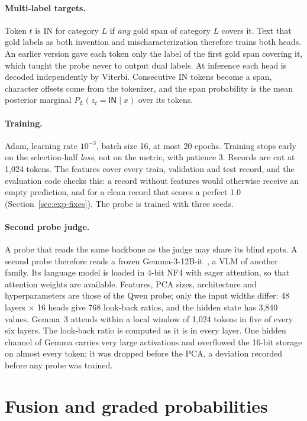 \paragraph{Multi-label targets.}
Token $t$ is \textsf{IN} for category $L$ if \emph{any} gold span of category $L$ covers it. Text that gold labels as both invention and mischaracterization therefore trains both heads. An earlier version gave each token only the label of the first gold span covering it, which taught the probe never to output dual labels. At inference each head is decoded independently by Viterbi. Consecutive \textsf{IN} tokens become a span, character offsets come from the tokenizer, and the span probability is the mean posterior marginal $P_L(z_t = \textsf{IN} \mid x)$ over its tokens.

\paragraph{Training.}
Adam, learning rate $10^{-3}$, batch size 16, at most 20 epochs. Training stops early on the selection-half \emph{loss}, not on the metric, with patience 3. Records are cut at 1,024 tokens. The features cover every train, validation and test record, and the evaluation code checks this: a record without features would otherwise receive an empty prediction, and for a clean record that scores a perfect 1.0 (Section~\ref{sec:exp-fixes}). The probe is trained with three seeds.

\paragraph{Second probe judge.}
A probe that reads the same backbone as the judge may share its blind spots. A second probe therefore reads a frozen Gemma-3-12B-it~\cite{gemma2025gemma3}, a VLM of another family. Its language model is loaded in 4-bit NF4 with eager attention, so that attention weights are available. Features, PCA sizes, architecture and hyperparameters are those of the Qwen probe; only the input widths differ: 48 layers $\times$ 16 heads give 768 look-back ratios, and the hidden state has 3,840 values. Gemma~3 attends within a local window of 1,024 tokens in five of every six layers. The look-back ratio is computed as it is in every layer. One hidden channel of Gemma carries very large activations and overflowed the 16-bit storage on almost every token; it was dropped before the PCA, a deviation recorded before any probe was trained.

\section{Fusion and graded probabilities}\label{sec:fusion}

